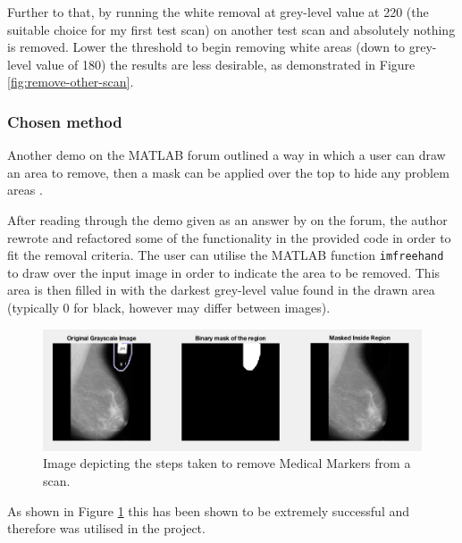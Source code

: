 Further to that, by running the white removal at grey-level value at 220 (the suitable choice for my first test scan) on another test scan and absolutely nothing is removed. Lower the threshold to begin removing white areas (down to grey-level value of 180) the results are less desirable, as demonstrated in Figure \ref{fig:remove-other-scan}.

\subsubsection{Chosen method}

Another demo on the MATLAB forum outlined a way in which a user can draw an area to remove, then a mask can be applied over the top to hide any problem areas \cite{binary_mask}.

After reading through the demo given as an answer by  on the forum, the author rewrote and refactored some of the functionality in the provided code in order to fit the removal criteria. The user can utilise the MATLAB function \texttt{imfreehand} \cite{imfreehand} to draw over the input image in order to indicate the area to be removed. This area is then filled in with the darkest grey-level value found in the drawn area (typically 0 for black, however may differ between images).

\begin{figure}[H]
  \centering
  \includegraphics[scale=0.4]{Chapter2/technical-img/draw-to-remove.png}
  \caption{Image depicting the steps taken to remove Medical Markers from a scan.}
  \label{fig:remove-marker}
\end{figure}

As shown in Figure \ref{fig:remove-marker} this has been shown to be extremely successful and therefore was utilised in the project.
